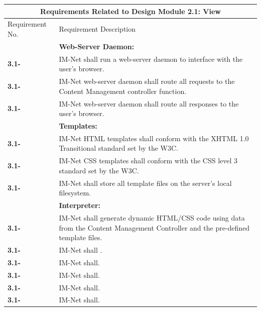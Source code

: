 \documentclass[letterpaper,12pt]{article}
\newcounter{rcounter}						%
\newcommand\rnumber{\stepcounter{rcounter}\arabic{rcounter}}
\begin{document}
{\begin{center}
\begin{tabular}{|l|p{6in}|}
\hline 
\multicolumn{2}{|c|}{\textbf{Requirements Related to Design Module 2.1: View}} \\ 
\hline 
Requirement No. & Requirement Description \\ 
\hline
& \textbf{Web-Server Daemon:} \\
\hline
\textbf{3.1-\rnumber} & IM-Net shall run a web-server daemon to interface with the user's browser. \\ 
\hline 
\textbf{3.1-\rnumber} & IM-Net web-server daemon shall route all requests to the Content Management controller function. \\ 
\hline 
\textbf{3.1-\rnumber} & IM-Net web-server daemon shall route all responses to the user's browser. \\ 
\hline  
& \textbf{Templates:} \\
\hline
\textbf{3.1-\rnumber} & IM-Net HTML templates shall conform with the XHTML 1.0 Transitional standard set by the W3C. \\ 
\hline 
\textbf{3.1-\rnumber} & IM-Net CSS templates shall conform with the CSS level 3 standard set by the W3C. \\ 
\hline 
\textbf{3.1-\rnumber} & IM-Net shall store all template files on the server's local filesystem. \\ 
\hline 
& \textbf{Interpreter:} \\
\hline
\textbf{3.1-\rnumber} & IM-Net shall generate dynamic HTML/CSS code using data from the Content Management Controller and the pre-defined template files. \\ 
\hline 
\textbf{3.1-\rnumber} & IM-Net shall . \\ 
\hline 
\textbf{3.1-\rnumber} & IM-Net shall. \\ 
\hline 
\textbf{3.1-\rnumber} & IM-Net shall. \\ 
\hline 
\textbf{3.1-\rnumber} & IM-Net shall. \\ 
\hline 
\textbf{3.1-\rnumber} & IM-Net shall. \\ 
\hline 

\end{tabular} 
\end{center}

}
\end{document}
